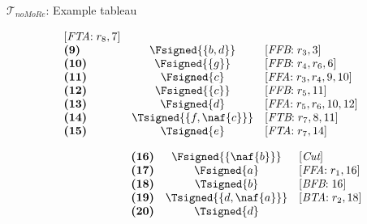 \begin{frame}{$\mathcal{T}_{\textit{noMoRe}}$: Example tableau}
\begin{center}
\begin{minipage}[t]{16cm}
\begin{minipage}[t]{4.5cm}
\[\begin{array}{lcl}
  [\textit{FTA}{:}\;r_8, \text{7}]                 \\
\textbf{(9)}                                       &
  \Fsigned{\{b,d\}}                                &
  [\textit{FFB}{:}\;r_3, \text{3}]                 \\
\textbf{(10)}                                      &
  \Fsigned{\{g\}}                                  &
  [\textit{FFB}{:}\;r_4, r_6, \text{6}]            \\
\textbf{(11)}                                      &
  \Fsigned{c}                                      &
  [\textit{FFA}{:}\;r_3,r_4, \text{9}, \text{10}]  \\
\textbf{(12)}                                      &
  \Fsigned{\{c\}}                                  &
  [\textit{FFB}{:}\;r_5, \text{11}]                \\
\textbf{(13)}                                      &
  \Fsigned{d}                                      &
  [\textit{FFA}{:}\;r_5,r_6, \text{10}, \text{12}] \\
\textbf{(14)}                                      &
  \Tsigned{\{f,\naf{c}\}}                   &
  [\textit{FTB}{:}\;r_7, \text{8}, \text{11}]      \\
\textbf{(15)}                                      &
  \Tsigned{e}                                      &
  [\textit{FTA}{:}\;r_7, \text{14}]
\end{array}
\]
\end{minipage}
\begin{minipage}[t]{6cm}
\[
\hspace{2.2cm}
\begin{array}{lcl}
\textbf{(16)}                                      &
  \Fsigned{\{\naf{b}\}}                     &
  [\textit{Cut}]                                   \\
\textbf{(17)}                                      &
  \Fsigned{a}                                      &
  [\textit{FFA}{:}\; r_1, \text{16}]               \\
\textbf{(18)}                                      &
  \Tsigned{b}                                      &
  [\textit{BFB}{:}\; \text{16}]                    \\
\textbf{(19)}                                      &
  \Tsigned{\{d,\naf{a}\}}                   &
  [\textit{BTA}{:}\;r_2, \text{18}]                \\
\textbf{(20)}                                      &
  \Tsigned{d}                                      &

\end{array}\]
\end{minipage}
\end{minipage}
\end{center}
\end{frame}
